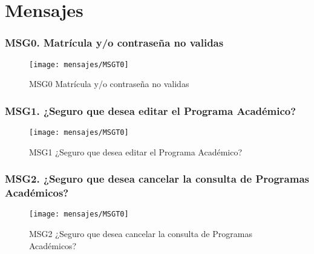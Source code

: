 \chapter{Mensajes}

\subsection{MSG0. Matrícula y/o contraseña no validas}
    \begin{figure}[htbp]
        \begin{center}
            \texttt{[image: mensajes/MSGT0]}
            \caption{MSG0 Matrícula y/o contraseña no validas}
            \label{fig:MSG0}
        \end{center}
    \end{figure}
    
\subsection{MSG1. ¿Seguro que desea editar el Programa Académico?}
    \begin{figure}[htbp]
        \begin{center}
            \texttt{[image: mensajes/MSGT0]}
            \caption{MSG1 ¿Seguro que desea editar el Programa Académico?}
            \label{fig:MSG1}
        \end{center}
    \end{figure}
    
\subsection{MSG2. ¿Seguro que desea cancelar la consulta de Programas Académicos?}
    \begin{figure}[htbp]
        \begin{center}
            \texttt{[image: mensajes/MSGT0]}
            \caption{MSG2 ¿Seguro que desea cancelar la consulta de Programas Académicos?}
            \label{fig:MSG2}
        \end{center}
    \end{figure}
    
